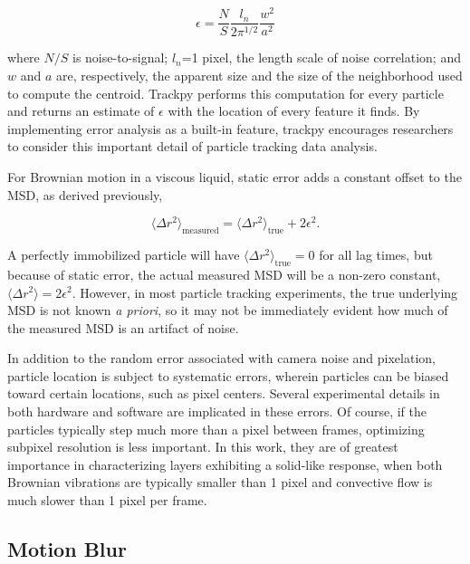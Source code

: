 \begin{equation}
\epsilon = \frac{N}{S}\frac{l_n}{2\pi^{1/2}}\frac{w^2}{a^2}
\end{equation}

\noindent where $N/S$ is noise-to-signal; $l_n$=1 pixel, the length scale of noise correlation; and $w$ and $a$ are, respectively, the apparent size and the size of the neighborhood used to compute the centroid. Trackpy performs this computation for every particle and returns an estimate of $\epsilon$ with the location of every feature it finds. By implementing error analysis as a built-in feature, trackpy encourages researchers to consider this important detail of particle tracking data analysis.

For Brownian motion in a viscous liquid, static error adds a constant offset to the MSD, as derived previously\cite{Martin2002a},

\begin{equation}
\langle \Delta r^2 \rangle_{\text{measured}} = \langle \Delta r^2 \rangle_{\text{true}} + 2\epsilon^2.
\end{equation}

\noindent A perfectly immobilized particle will have $\langle\Delta r^2\rangle_{\text{true}} = 0$ for all lag times, but because of static error, the actual measured MSD will be a non-zero constant, $\langle \Delta r^2 \rangle = 2\epsilon^2$\cite{Martin2002a,Crocker2007}. However, in most particle tracking experiments, the true underlying MSD is not known \emph{a priori}, so it may not be immediately evident how much of the measured MSD is an artifact of noise.

In addition to the random error associated with camera noise and pixelation, particle location is subject to systematic errors, wherein particles can be biased toward certain locations, such as pixel centers. Several experimental details in both hardware and software are implicated in these errors\cite{Crocker2007}. Of course, if the particles typically step much more than a pixel between frames, optimizing subpixel resolution is less important. In this work, they are of greatest importance in characterizing layers exhibiting a solid-like response, when both Brownian vibrations are typically smaller than 1 pixel and convective flow is much slower than 1 pixel per frame.

\subsection{Motion Blur}

